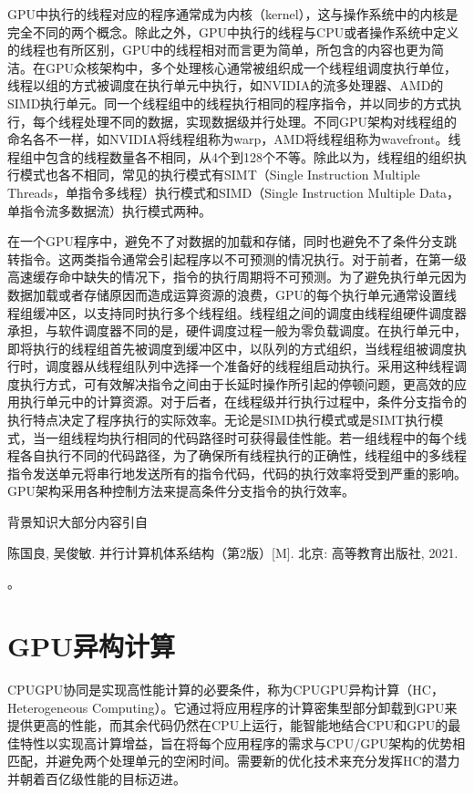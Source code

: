 \documentclass[a4paper,12pt,english]{sphinxmanual}
\begin{document}
\sphinxAtStartPar
GPU中执行的线程对应的程序通常成为内核（kernel），这与操作系统中的内核是完全不同的两个概念。除此之外，GPU中执行的线程与CPU或者操作系统中定义的线程也有所区别，GPU中的线程相对而言更为简单，所包含的内容也更为简洁。在GPU众核架构中，多个处理核心通常被组织成一个线程组调度执行单位，线程以组的方式被调度在执行单元中执行，如NVIDIA的流多处理器、AMD的SIMD执行单元。同一个线程组中的线程执行相同的程序指令，并以同步的方式执行，每个线程处理不同的数据，实现数据级并行处理。不同GPU架构对线程组的命名各不一样，如NVIDIA将线程组称为warp，AMD将线程组称为wavefront。线程组中包含的线程数量各不相同，从4个到128个不等。除此以为，线程组的组织执行模式也各不相同，常见的执行模式有SIMT（Single Instruction Multiple Threads，单指令多线程）执行模式和SIMD（Single Instruction Multiple Data，单指令流多数据流）执行模式两种。

\sphinxAtStartPar
在一个GPU程序中，避免不了对数据的加载和存储，同时也避免不了条件分支跳转指令。这两类指令通常会引起程序以不可预测的情况执行。对于前者，在第一级高速缓存命中缺失的情况下，指令的执行周期将不可预测。为了避免执行单元因为数据加载或者存储原因而造成运算资源的浪费，GPU的每个执行单元通常设置线程组缓冲区，以支持同时执行多个线程组。线程组之间的调度由线程组硬件调度器承担，与软件调度器不同的是，硬件调度过程一般为零负载调度。在执行单元中，即将执行的线程组首先被调度到缓冲区中，以队列的方式组织，当线程组被调度执行时，调度器从线程组队列中选择一个准备好的线程组启动执行。采用这种线程调度执行方式，可有效解决指令之间由于长延时操作所引起的停顿问题，更高效的应用执行单元中的计算资源。对于后者，在线程级并行执行过程中，条件分支指令的执行特点决定了程序执行的实际效率。无论是SIMD执行模式或是SIMT执行模式，当一组线程均执行相同的代码路径时可获得最佳性能。若一组线程中的每个线程各自执行不同的代码路径，为了确保所有线程执行的正确性，线程组中的多线程指令发送单元将串行地发送所有的指令代码，代码的执行效率将受到严重的影响。GPU架构采用各种控制方法来提高条件分支指令的执行效率。

\sphinxAtStartPar
背景知识大部分内容引自 %
\begin{footnote}[1]\sphinxAtStartFootnote
陈国良, 吴俊敏. 并行计算机体系结构（第2版）{[}M{]}. 北京: 高等教育出版社, 2021.
%
\end{footnote}。


\section{GPU异构计算}
\label{\detokenize{gpu-computing/gpu-computing:gpu}}
\sphinxAtStartPar
CPU\sphinxhyphen{}GPU协同是实现高性能计算的必要条件，称为CPU\sphinxhyphen{}GPU异构计算（HC，Heterogeneous Computing）。它通过将应用程序的计算密集型部分卸载到GPU来提供更高的性能，而其余代码仍然在CPU上运行，能智能地结合CPU和GPU的最佳特性以实现高计算增益，旨在将每个应用程序的需求与CPU/GPU架构的优势相匹配，并避免两个处理单元的空闲时间。需要新的优化技术来充分发挥HC的潜力并朝着百亿级性能的目标迈进。
\end{document}
